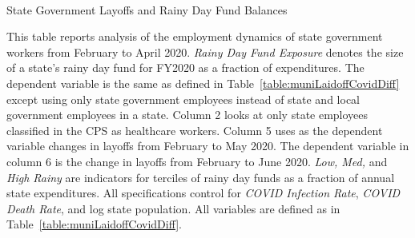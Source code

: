 \begin{landscape}

\begin{table}[!ht]
\begin{center}
\begin{threeparttable}

\caption{\\ State Government Layoffs and Rainy Day Fund Balances}
\label{table:layoffRainyDay}

\centering 

\begin{small}

	

\end{small}

\begin{footnotesize}
\begin{tablenotes}
\item This table reports analysis of the employment dynamics of state government workers from February to April 2020. \emph{Rainy Day Fund Exposure} denotes the size of a state's rainy day fund for FY2020 as a fraction of expenditures. The dependent variable is the same as defined in Table~\ref{table:muniLaidoffCovidDiff} except using only state government employees instead of state and local government employees in a state. Column 2 looks at only state employees classified in the CPS as healthcare workers. Column 5 uses as the dependent variable changes in layoffs from February to May 2020. The dependent variable in column 6 is the change in layoffs from February to June 2020.  \emph{Low, Med,} and \emph{High Rainy} are indicators for terciles of rainy day funds as a fraction of annual state expenditures. All specifications control for \emph{COVID Infection Rate}, \emph{COVID Death Rate}, and log state population. All variables are defined as in Table~\ref{table:muniLaidoffCovidDiff}.
\end{tablenotes}
\end{footnotesize}

\end{threeparttable}
\end{center}
\end{table}

\thispagestyle{empty}

\end{landscape}


